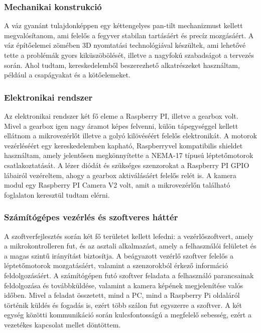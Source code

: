 \documentclass[12pt,a4paper]{article}
\begin{document}
\subsubsection*{Mechanikai konstrukció}

A váz gyanánt tulajdonképpen egy kéttengelyes pan-tilt mechanizmust kellett megvalósítanom, ami felelős a fegyver stabilan tartásáért és precíz mozgásáért. A váz építőelemei zömében 3D nyomtatási technológiával készültek, ami lehetővé tette a problémák gyors kiküszöbölését, illetve a nagyfokú szabadságot a tervezés során. Ahol tudtam, kereskedelemből beszerezhető alkatrészeket használtam, például a csapágyakat és a kötőelemeket.

\subsubsection*{Elektronikai rendszer}

Az elektronikai rendszer két fő eleme a Raspberry PI, illetve a gearbox volt. Mivel a gearbox igen nagy áramot képes felvenni, külön tápegységgel kellett ellátnom a mikrovezérlőt illetve a golyó kilövéséért felelős elektronikát. A motorok vezérléséért egy kereskedelemben kapható, Raspberryvel kompatibilis shieldet használtam, amely jelentősen megkönnyítette a NEMA-17 típusú léptetőmotorok csatlakoztatását. A lézer diódát és szükséges szenzorokat a Raspberry PI GPIO lábairól vezéreltem, ahogy a gearbox aktiválásáért felelős relét is. A kamera modul egy Raspberry PI Camera V2 volt, amit a mikrovezérlőn található foglalaton keresztül tudtam elérni.

\subsubsection*{Számítógépes vezérlés és szoftveres háttér}

A szoftverfejlesztés során két fő területet kellett lefedni: a vezérlőszoftvert, amely a mikrokontrolleren fut, és az asztali alkalmazást, amely a felhasználói felületet és a magas szintű irányítást biztosítja. A beágyazott vezérlő szoftver felelős a léptetőmotorok mozgatásáért, valamint a szenzorokból érkező információ feldolgozásáért. A számítógépen futó szoftver feladata a felhasználó parancsainak feldolgozása és továbbküldése, valamint a kamera képének megjelenítése valós időben. Mivel a feladat összetett, mind a PC, mind a Raspberry Pi oldaláról történik küldés és fogadás is, ezért több szálon fut egyszerre a szoftver. A két egység közötti kommunikáció során kulcsfontosságú a megfelelő sebesség, ezért a vezetékes kapcsolat mellet döntöttem.
\end{document}
